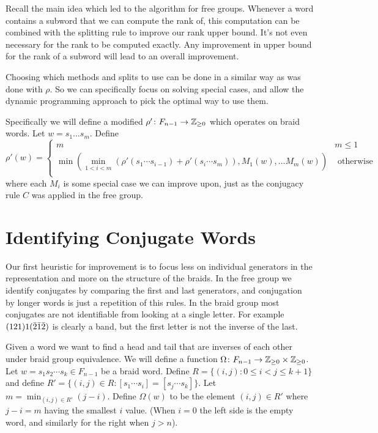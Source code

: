 \documentclass[12pt]{thesis}
\begin{document}
Recall the main idea which led to the algorithm for free groups.
Whenever a word contains a subword that we can compute the rank of,
this computation can be combined with the splitting rule to improve
our rank upper bound.
It's not even necessary for the rank to be computed exactly.
Any improvement in upper bound for the rank of a subword  will lead
to an overall improvement.
 
Choosing which methods and splits to use
can be done in a similar way as was done with $\rho$.
So we can specifically focus on solving special cases,
and allow the dynamic programming approach to pick the optimal
way to use them.

Specifically we will define a modified $\rho' \colon F_{n-1} \rightarrow \mathbb{Z}_{\geq 0}$ which operates
on braid words.
Let $w = s_{1} \ldots s_{m}$. Define
\begin{equation}
\rho'(w) =
\begin{cases}
    m & m \leq 1 \\
    \min( \min_{1< i < m} ( \rho'(s_{1} \cdots s_{i - 1}) + \rho'(s_{i} \cdots s_{m}) ), M_{1}(w), \ldots M_{m}(w)) &  \text{ otherwise } \\
\end{cases}
\end{equation}
where each $M_{i}$ is some special
case we can improve upon, just as the conjugacy rule $C$ was applied in the free group.

\section{Identifying Conjugate Words}

Our first heuristic for improvement is to focus less on individual generators in the representation
and more on the structure of the braids.
In the free group we identify conjugates by comparing the first and last generators,
and conjugation by longer words is just a repetition of this rules.
In the braid group most conjugates are not identifiable from looking at a single
letter.
For example $(1 2 1) 1 (\bar{2} \bar{1} \bar{2})$ is clearly a band,
but the first letter is not the inverse of the last.

Given a word  we want to find a head
and tail that are inverses of each other under braid group equivalence.
We will define a function $\Omega \colon F_{n-1} \rightarrow \mathbb{Z}_{\geq 0} \times \mathbb{Z}_{\geq 0}$.
Let $w = s_{1}s_{2} \cdots  s_{k} \in F_{n-1}$ be a braid word.
Define $R = \{ (i, j) \colon  0 \leq i < j \leq k + 1 \}$ 
and define $R' = \{ (i, j) \in R \colon [s_{1}\cdots s_{i}] = [s_{j} \cdots s_{k}] \}$.
Let $m = \min_{(i, j) \in R'} (j - i)$.
Define $\Omega(w)$ to be the element $(i, j) \in R'$
where $j - i = m$ having the smallest $i$ value.
(When $i = 0$ the left side is the empty word, and similarly for the right when $j > n$).
\end{document}
